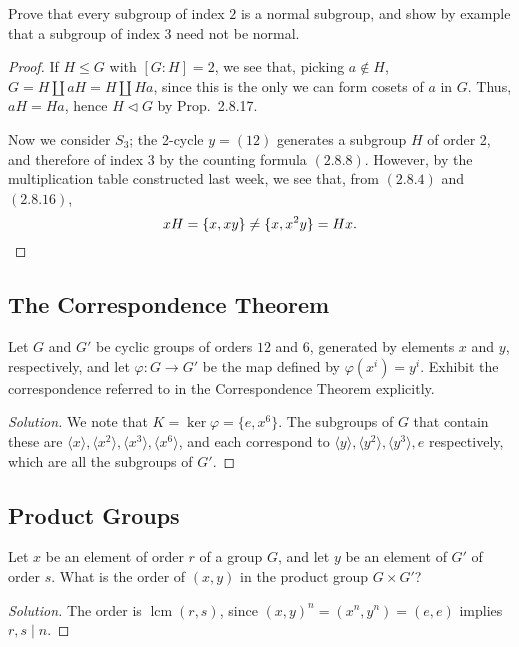 \documentclass[12pt]{article}
\theoremstyle{remark}
\DeclareMathOperator{\lcm}{lcm}
\begin{document}
\setcounter{subsubsection}{9}
\begin{problem}\label{exc:2.8.10}
  Prove that every subgroup of index $2$ is a normal subgroup, and show by example that a subgroup of index $3$ need not be normal.
\end{problem}
\begin{proof}
  If $H \leqslant G$ with $[G : H] = 2$, we see that, picking $a \notin H$, $G = H \amalg aH = H \amalg Ha$, since this is the only we can form cosets of $a$ in $G$. Thus, $aH = Ha$, hence $H \lhd G$ by Prop.~2.8.17.
  \par Now we consider $S_3$; the 2-cycle $y = (12)$ generates a subgroup $H$ of order 2, and therefore of index 3 by the counting formula $(2.8.8)$. However, by the multiplication table constructed last week, we see that, from $(2.8.4)$ and $(2.8.16)$,
  \begin{equation*}
    xH = \{x,xy\} \ne \{x,x^2y\} = Hx.\qedhere
  \end{equation*}
\end{proof}

\setcounter{subsection}{9}
\subsection{The Correspondence Theorem}
\setcounter{subsubsection}{2}
\begin{problem}
  Let $G$ and $G'$ be cyclic groups of orders $12$ and $6$, generated by elements $x$ and $y$, respectively, and let $\varphi\colon G \to G'$ be the map defined by $\varphi(x^i) = y^i$. Exhibit the correspondence referred to in the Correspondence Theorem explicitly.
\end{problem}
\begin{proof}[Solution]
  We note that $K = \ker\varphi = \{e,x^6\}$. The subgroups of $G$ that contain these are $\langle x \rangle,\langle x^2 \rangle,\langle x^3 \rangle,\langle x^6\rangle$, and each correspond to $\langle y \rangle,\langle y^2 \rangle,\langle y^3 \rangle,e$ respectively, which are all the subgroups of $G'$.
\end{proof}
\subsection{Product Groups}
\begin{problem}
  Let $x$ be an element of order $r$ of a group $G$, and let $y$ be an element of $G'$ of order $s$. What is the order of $(x,y)$ in the product group $G \times G'$?
\end{problem}
\begin{proof}[Solution]
  The order is $\lcm(r,s)$, since $(x,y)^n = (x^n,y^n) = (e,e)$ implies $r,s \mid n$.
\end{proof}
\end{document}
